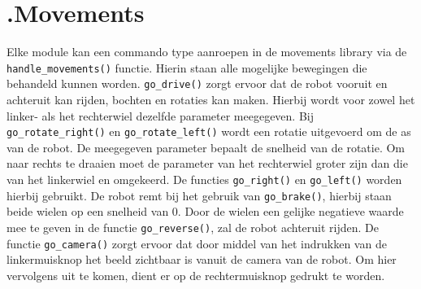 \documentclass[a4paper,10pt]{article}
\begin{document}
\section*{\label{movements}\thesection.\quad Movements}
Elke module kan een commando type aanroepen in de movements library via de \verb!handle_movements()! functie. Hierin staan alle mogelijke bewegingen die behandeld kunnen worden.  
\verb!go_drive()! zorgt ervoor dat de robot vooruit en achteruit kan rijden, bochten en rotaties kan maken. Hierbij wordt voor zowel het linker- als het rechterwiel dezelfde parameter meegegeven. 
Bij \verb!go_rotate_right()! en \verb!go_rotate_left()! wordt een rotatie uitgevoerd om de as van de robot. De meegegeven parameter bepaalt de snelheid van de rotatie. 
Om naar rechts te draaien moet de parameter van het rechterwiel groter zijn dan die van het linkerwiel en omgekeerd. De functies \verb!go_right()! en \verb!go_left()! worden hierbij gebruikt.
De robot remt bij het gebruik van \verb!go_brake()!, hierbij staan beide wielen op een snelheid van 0.
Door de wielen een gelijke negatieve waarde mee te geven in de functie \verb!go_reverse()!, zal de robot achteruit rijden.
De functie \verb!go_camera()! zorgt ervoor dat door middel van het indrukken van de linkermuisknop het beeld zichtbaar is vanuit de camera van de robot. Om hier vervolgens uit te komen, dient er op de rechtermuisknop gedrukt te worden.
\end{document}
